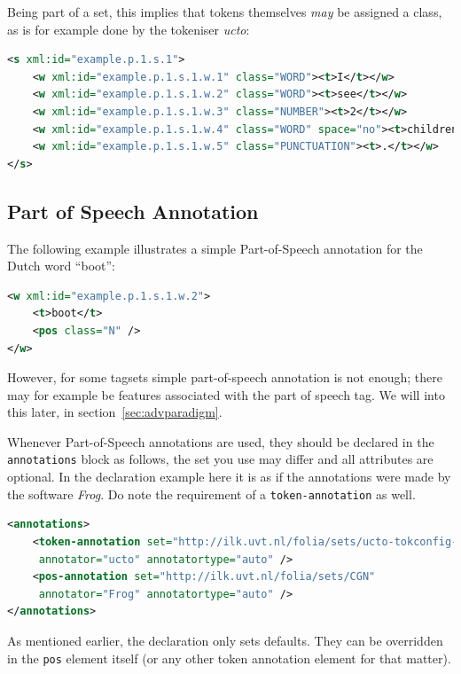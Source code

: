 \documentclass[a4paper,12pt]{report}
\begin{document}
Being part of a set, this implies that tokens themselves \emph{may} be assigned a class, as is for example done by the tokeniser \emph{ucto}:

\begin{lstlisting}[language=xml]
<s xml:id="example.p.1.s.1">
    <w xml:id="example.p.1.s.1.w.1" class="WORD"><t>I</t></w>
    <w xml:id="example.p.1.s.1.w.2" class="WORD"><t>see</t></w>
    <w xml:id="example.p.1.s.1.w.3" class="NUMBER"><t>2</t></w>
    <w xml:id="example.p.1.s.1.w.4" class="WORD" space="no"><t>children</t></w>
    <w xml:id="example.p.1.s.1.w.5" class="PUNCTUATION"><t>.</t></w>
</s>
\end{lstlisting}        


\subsection{Part of Speech Annotation}

The following example illustrates a simple Part-of-Speech annotation for the Dutch word ``boot'':

\begin{lstlisting}[language=xml]
<w xml:id="example.p.1.s.1.w.2">
    <t>boot</t>
    <pos class="N" />
</w>
\end{lstlisting}



However, for some tagsets simple part-of-speech annotation is not enough; there may for example be features associated with the part of speech tag. We will into this later, in section~\ref{sec:advparadigm}.

Whenever Part-of-Speech annotations are used, they should be declared in the \texttt{annotations} block as follows, the set you use may differ and all attributes are optional. In the declaration example here it is as if the annotations were made by the software \emph{Frog}. Do note the requirement of a \texttt{token-annotation} as well.

\begin{lstlisting}[language=xml]
<annotations>
    <token-annotation set="http://ilk.uvt.nl/folia/sets/ucto-tokconfig-nl" 
     annotator="ucto" annotatortype="auto" />
    <pos-annotation set="http://ilk.uvt.nl/folia/sets/CGN" 
     annotator="Frog" annotatortype="auto" />
</annotations>
\end{lstlisting}

As mentioned earlier, the declaration only sets defaults. They can be overridden in the \texttt{pos} element itself (or any other token annotation element for that matter).
\end{document}
